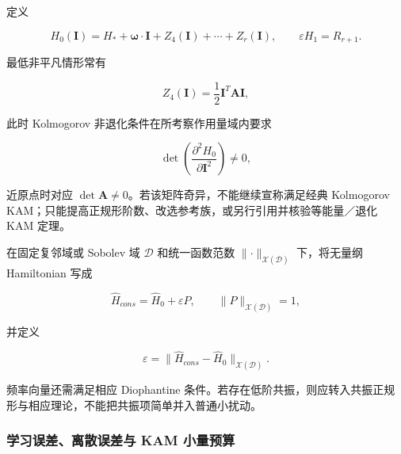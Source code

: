 定义

\begin{equation}
\label{eq:hamiltonian-3-84}
\boxed{H_{0}\left( \mathbf{I} \right) = H_{*} + \bm{\omega} \cdot \mathbf{I} + Z_{4}\left( \mathbf{I} \right) + \cdots + Z_{r}\left( \mathbf{I} \right),\quad\quad\varepsilon H_{1} = R_{r + 1}.}
\end{equation}

最低非平凡情形常有

\begin{equation}
\label{eq:hamiltonian-3-85}
Z_{4}\left( \mathbf{I} \right) = \frac{1}{2}\mathbf{I}^{T}\mathbf{A}\mathbf{I},
\end{equation}

此时 Kolmogorov 非退化条件在所考察作用量域内要求

\begin{equation}
\label{eq:hamiltonian-3-86}
\boxed{\det\left( \frac{\partial^{2}H_{0}}{\partial\mathbf{I}^{2}} \right) \neq 0,}
\end{equation}

近原点时对应 \(\det\mathbf{A} \neq 0\)。若该矩阵奇异，不能继续宣称满足经典 Kolmogorov KAM；只能提高正规形阶数、改选参考族，或另行引用并核验等能量／退化 KAM 定理。

在固定复邻域或 Sobolev 域 \(\mathcal{D}\) 和统一函数范数 \(\parallel \cdot \parallel_{\mathcal{X}\left( \mathcal{D} \right)}\) 下，将无量纲 Hamiltonian 写成

\begin{equation}
\label{eq:hamiltonian-3-87}
{\widehat{H}}_{cons} = {\widehat{H}}_{0} + \varepsilon P,\quad\quad \parallel P \parallel_{\mathcal{X}\left( \mathcal{D} \right)} = 1,
\end{equation}

并定义

\begin{equation}
\label{eq:hamiltonian-3-88}
\boxed{\varepsilon = \left. \parallel{\widehat{H}}_{cons} - {\widehat{H}}_{0} \right.\parallel_{\mathcal{X}\left( \mathcal{D} \right)}.}
\end{equation}

频率向量还需满足相应 Diophantine 条件。若存在低阶共振，则应转入共振正规形与相应理论，不能把共振项简单并入普通小扰动。

\subsubsection{学习误差、离散误差与 KAM 小量预算}\label{sec:hamiltonian-3-7-4}

